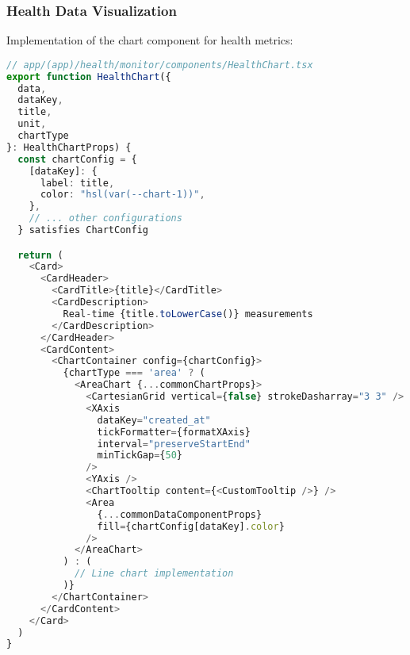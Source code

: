 \subsubsection{Health Data Visualization}
Implementation of the chart component for health metrics:

\begin{lstlisting}[language=typescript,
                   basicstyle=\ttfamily\small,
                   keywordstyle=\color{blue},
                   stringstyle=\color{red},
                   commentstyle=\color{green!60!black}]
// app/(app)/health/monitor/components/HealthChart.tsx
export function HealthChart({ 
  data, 
  dataKey, 
  title, 
  unit, 
  chartType 
}: HealthChartProps) {
  const chartConfig = {
    [dataKey]: {
      label: title,
      color: "hsl(var(--chart-1))",
    },
    // ... other configurations
  } satisfies ChartConfig

  return (
    <Card>
      <CardHeader>
        <CardTitle>{title}</CardTitle>
        <CardDescription>
          Real-time {title.toLowerCase()} measurements
        </CardDescription>
      </CardHeader>
      <CardContent>
        <ChartContainer config={chartConfig}>
          {chartType === 'area' ? (
            <AreaChart {...commonChartProps}>
              <CartesianGrid vertical={false} strokeDasharray="3 3" />
              <XAxis
                dataKey="created_at"
                tickFormatter={formatXAxis}
                interval="preserveStartEnd"
                minTickGap={50}
              />
              <YAxis />
              <ChartTooltip content={<CustomTooltip />} />
              <Area
                {...commonDataComponentProps}
                fill={chartConfig[dataKey].color}
              />
            </AreaChart>
          ) : (
            // Line chart implementation
          )}
        </ChartContainer>
      </CardContent>
    </Card>
  )
}
\end{lstlisting} 